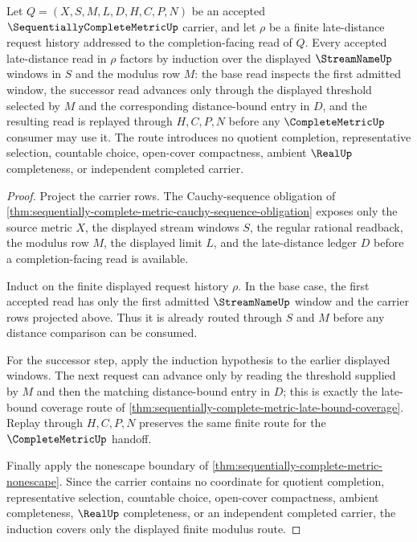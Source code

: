 \begin{theorem}
\label{thm:sequentially-complete-metric-induction-coverage}
Let $Q=(X,S,M,L,D,H,C,P,N)$ be an accepted $\SequentiallyCompleteMetricUp$ carrier, and let $\rho$ be a finite late-distance request history addressed to the completion-facing read of $Q$. Every accepted late-distance read in $\rho$ factors by induction over the displayed $\StreamNameUp$ windows in $S$ and the modulus row $M$: the base read inspects the first admitted window, the successor read advances only through the displayed threshold selected by $M$ and the corresponding distance-bound entry in $D$, and the resulting read is replayed through $H,C,P,N$ before any $\CompleteMetricUp$ consumer may use it. The route introduces no quotient completion, representative selection, countable choice, open-cover compactness, ambient $\RealUp$ completeness, or independent completed carrier.
\end{theorem}
\begin{proof}
Project the carrier rows. The Cauchy-sequence obligation of \autoref{thm:sequentially-complete-metric-cauchy-sequence-obligation} exposes only the source metric $X$, the displayed stream windows $S$, the regular rational readback, the modulus row $M$, the displayed limit $L$, and the late-distance ledger $D$ before a completion-facing read is available.

Induct on the finite displayed request history $\rho$. In the base case, the first accepted read has only the first admitted $\StreamNameUp$ window and the carrier rows projected above. Thus it is already routed through $S$ and $M$ before any distance comparison can be consumed.

For the successor step, apply the induction hypothesis to the earlier displayed windows. The next request can advance only by reading the threshold supplied by $M$ and then the matching distance-bound entry in $D$; this is exactly the late-bound coverage route of \autoref{thm:sequentially-complete-metric-late-bound-coverage}. Replay through $H,C,P,N$ preserves the same finite route for the $\CompleteMetricUp$ handoff.

Finally apply the nonescape boundary of \autoref{thm:sequentially-complete-metric-nonescape}. Since the carrier contains no coordinate for quotient completion, representative selection, countable choice, open-cover compactness, ambient completeness, $\RealUp$ completeness, or an independent completed carrier, the induction covers only the displayed finite modulus route.
\end{proof}

